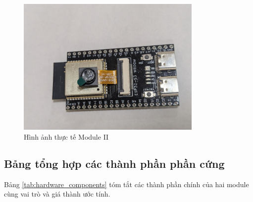 \begin{figure}[H]
    \centering
    \includegraphics[width=0.8\textwidth]{figures/real_board2.jpg}
    \caption{Hình ảnh thực tế Module II}
    \label{fig:module2_photo}
\end{figure}

\subsection{Bảng tổng hợp các thành phần phần cứng}
\label{ssec:component_summary}

Bảng \ref{tab:hardware_components} tóm tắt các thành phần chính của hai module cùng vai trò và giá thành ước tính.

